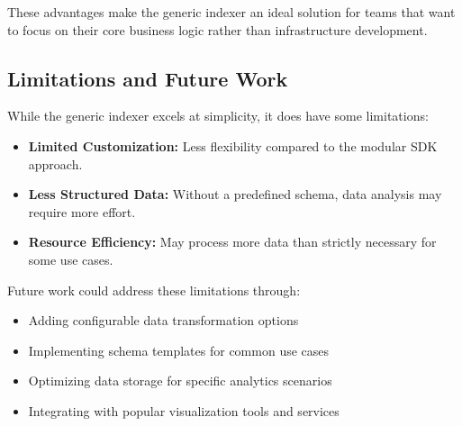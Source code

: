 These advantages make the generic indexer an ideal solution for teams that want to focus on their core business logic rather than infrastructure development.

\subsection{Limitations and Future Work}

While the generic indexer excels at simplicity, it does have some limitations:

\begin{itemize}
    \item \textbf{Limited Customization:} Less flexibility compared to the modular SDK approach.
    \item \textbf{Less Structured Data:} Without a predefined schema, data analysis may require more effort.
    \item \textbf{Resource Efficiency:} May process more data than strictly necessary for some use cases.
\end{itemize}

Future work could address these limitations through:

\begin{itemize}
    \item Adding configurable data transformation options
    \item Implementing schema templates for common use cases
    \item Optimizing data storage for specific analytics scenarios
    \item Integrating with popular visualization tools and services
\end{itemize} 